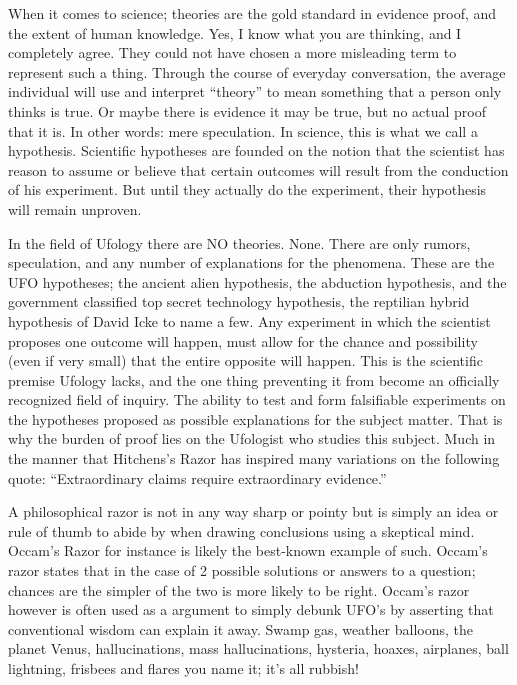 When it comes to science; theories are the gold standard in evidence proof, and
the extent of human knowledge. Yes, I know what you are thinking, and I completely
agree. They could not have chosen a more misleading term to represent such a thing.
Through the course of everyday conversation, the average individual will use and
interpret ``theory'' to mean something that a person only thinks is true. Or maybe
there is evidence it may be true, but no actual proof that it is. In other words:
mere speculation. In science, this is what we call a hypothesis. Scientific
hypotheses are founded on the notion that the scientist has reason to assume or
believe that certain outcomes will result from the conduction of his experiment.
But until they actually do the experiment, their hypothesis will remain unproven.

In the field of Ufology there are NO theories. None. There are only rumors,
speculation, and any number of explanations for the phenomena. These are the UFO
hypotheses; the ancient alien hypothesis, the abduction hypothesis, and the
government classified top secret technology hypothesis, the reptilian hybrid
hypothesis of David Icke to name a few.  Any experiment in which the scientist proposes one
outcome will happen, must allow for the chance and possibility (even if very
small) that the entire opposite will happen. This is the scientific premise
Ufology lacks, and the one thing preventing it from become an officially
recognized field of inquiry. The ability to test and form falsifiable experiments on the hypotheses
proposed as possible explanations for the subject matter. That is why the burden
of proof lies on the Ufologist who studies this subject. Much in the manner that
Hitchens's Razor has inspired many variations on the following quote:
``Extraordinary claims require extraordinary evidence.''

\begin{funfact}
A philosophical razor is not in any way sharp or pointy but is simply an idea or
rule of thumb to abide by when drawing conclusions using a skeptical mind.
Occam's Razor for instance is likely the best-known example of such. Occam's
razor states that in the case of 2 possible solutions or answers to a question;
chances are the simpler of the two is more likely to be right. Occam's razor
however is often used as a  argument to simply debunk UFO's by
asserting that conventional wisdom can explain it away. Swamp gas, weather
balloons, the planet Venus, hallucinations, mass hallucinations, hysteria,
hoaxes, airplanes, ball lightning, frisbees and flares you name it; it's all
rubbish!
\end{funfact}

